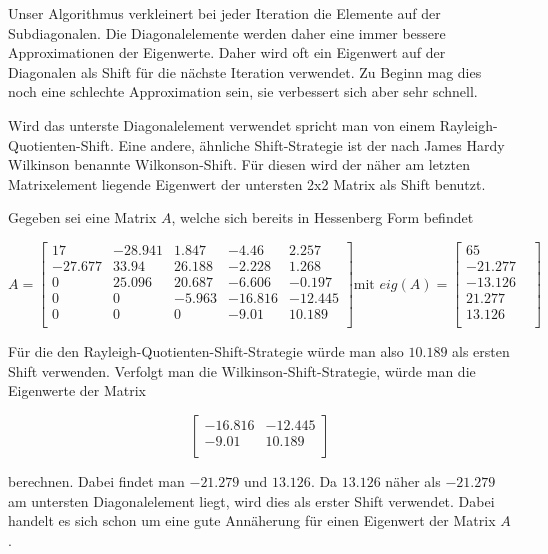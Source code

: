 Unser Algorithmus verkleinert bei jeder Iteration die Elemente auf der Subdiagonalen.
Die Diagonalelemente werden daher eine immer bessere Approximationen der Eigenwerte.
Daher wird oft ein Eigenwert auf der Diagonalen als Shift für die nächste Iteration verwendet.
Zu Beginn mag dies noch eine schlechte Approximation sein, sie verbessert sich aber sehr schnell.

Wird das unterste Diagonalelement verwendet spricht man von einem Rayleigh-Quotienten-Shift.
Eine andere, ähnliche Shift-Strategie ist der nach James Hardy Wilkinson benannte Wilkonson-Shift.
Für diesen wird der näher am letzten Matrixelement liegende Eigenwert der untersten \glqq 2x2 Matrix \grqq als Shift benutzt.

\begin{beispiel}
	Gegeben sei eine Matrix $A$, welche sich bereits in Hessenberg Form befindet
	
	\begin{equation}
	A=
	\begin{bmatrix}
	17 & -28.941 & 1.847 & -4.46 & 2.257\\
	-27.677 & 33.94 & 26.188 & -2.228 & 1.268\\
	0 & 25.096 & 20.687 & -6.606 & -0.197\\
	0 & 0 & -5.963 & -16.816 & -12.445\\
	0 & 0 & 0 & -9.01 & 10.189\\
	\end{bmatrix} \text{mit }
	eig(A)=
	\begin{bmatrix}
	65 & \\
	-21.277 & \\
	-13.126 & \\
	21.277 & \\
	13.126 & \\
	\end{bmatrix}
	\end{equation}
	
	Für die den Rayleigh-Quotienten-Shift-Strategie würde man also $10.189$ als ersten Shift verwenden.
	Verfolgt man die Wilkinson-Shift-Strategie, würde man die Eigenwerte der Matrix

	\begin{equation}
	\begin{bmatrix}
	 -16.816 & -12.445\\
	 -9.01 & 10.189\\
	\end{bmatrix}
	\end{equation}
	
	berechnen.
	Dabei findet man $-21.279$ und $13.126$.
	Da $13.126$ näher als $-21.279$ am untersten Diagonalelement liegt, wird dies als erster Shift verwendet.
	Dabei handelt es sich schon um eine gute Annäherung für einen Eigenwert der Matrix $A$.	
\end{beispiel}


